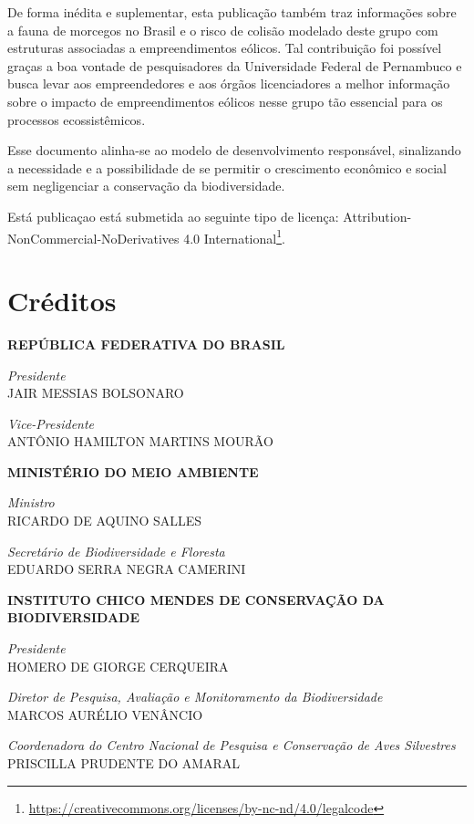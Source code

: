 \documentclass[
  oneside]{scrbook}
\DeclareRobustCommand{\href}[2]{#2\footnote{\url{#1}}}
\begin{document}
De forma inédita e suplementar, esta publicação também traz informações sobre a fauna de morcegos no Brasil e o risco de colisão modelado deste grupo com estruturas associadas a empreendimentos eólicos. Tal contribuição foi possível graças a boa vontade de pesquisadores da Universidade Federal de Pernambuco e busca levar aos empreendedores e aos órgãos licenciadores a melhor informação sobre o impacto de empreendimentos eólicos nesse grupo tão essencial para os processos ecossistêmicos.

Esse documento alinha-se ao modelo de desenvolvimento responsável, sinalizando a necessidade e a possibilidade de se permitir o crescimento econômico e social sem negligenciar a conservação da biodiversidade.

Está publicaçao está submetida ao seguinte tipo de licença: \href{https://creativecommons.org/licenses/by-nc-nd/4.0/legalcode}{Attribution-NonCommercial-NoDerivatives 4.0 International}.

\hypertarget{creditos}{%
\chapter*{Créditos}\label{creditos}}

\textbf{REPÚBLICA FEDERATIVA DO BRASIL}

\emph{Presidente}\\
JAIR MESSIAS BOLSONARO

\emph{Vice-Presidente}\\
ANTÔNIO HAMILTON MARTINS MOURÃO

\textbf{MINISTÉRIO DO MEIO AMBIENTE}

\emph{Ministro}\\
RICARDO DE AQUINO SALLES

\emph{Secretário de Biodiversidade e Floresta}\\
EDUARDO SERRA NEGRA CAMERINI

\textbf{INSTITUTO CHICO MENDES DE CONSERVAÇÃO DA BIODIVERSIDADE}

\emph{Presidente}\\
HOMERO DE GIORGE CERQUEIRA

\emph{Diretor de Pesquisa, Avaliação e Monitoramento da Biodiversidade}\\
MARCOS AURÉLIO VENÂNCIO

\emph{Coordenadora do Centro Nacional de Pesquisa e Conservação de Aves Silvestres}\\
PRISCILLA PRUDENTE DO AMARAL
\end{document}
